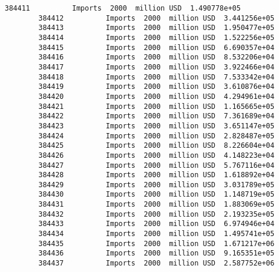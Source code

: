 \documentclass[11pt]{article}
\begin{document}
\begin{Verbatim}[commandchars=\\\{\}]
        384411          Imports  2000  million USD  1.490778e+05        
        384412          Imports  2000  million USD  3.441256e+05        
        384413          Imports  2000  million USD  1.950477e+05        
        384414          Imports  2000  million USD  1.522256e+05        
        384415          Imports  2000  million USD  6.690357e+04        
        384416          Imports  2000  million USD  8.532206e+04        
        384417          Imports  2000  million USD  3.922466e+04        
        384418          Imports  2000  million USD  7.533342e+04        
        384419          Imports  2000  million USD  3.610876e+04        
        384420          Imports  2000  million USD  4.294961e+04        
        384421          Imports  2000  million USD  1.165665e+05        
        384422          Imports  2000  million USD  7.361689e+04        
        384423          Imports  2000  million USD  3.651147e+05        
        384424          Imports  2000  million USD  2.828487e+05        
        384425          Imports  2000  million USD  8.226604e+04        
        384426          Imports  2000  million USD  4.148223e+04        
        384427          Imports  2000  million USD  5.767116e+04        
        384428          Imports  2000  million USD  1.618892e+04        
        384429          Imports  2000  million USD  3.031789e+05        
        384430          Imports  2000  million USD  1.148719e+05        
        384431          Imports  2000  million USD  1.883069e+05        
        384432          Imports  2000  million USD  2.193235e+05        
        384433          Imports  2000  million USD  6.974946e+04        
        384434          Imports  2000  million USD  1.495741e+05        
        384435          Imports  2000  million USD  1.671217e+06        
        384436          Imports  2000  million USD  9.165351e+05        
        384437          Imports  2000  million USD  2.587752e+06        
        

\end{Verbatim}
\end{document}
